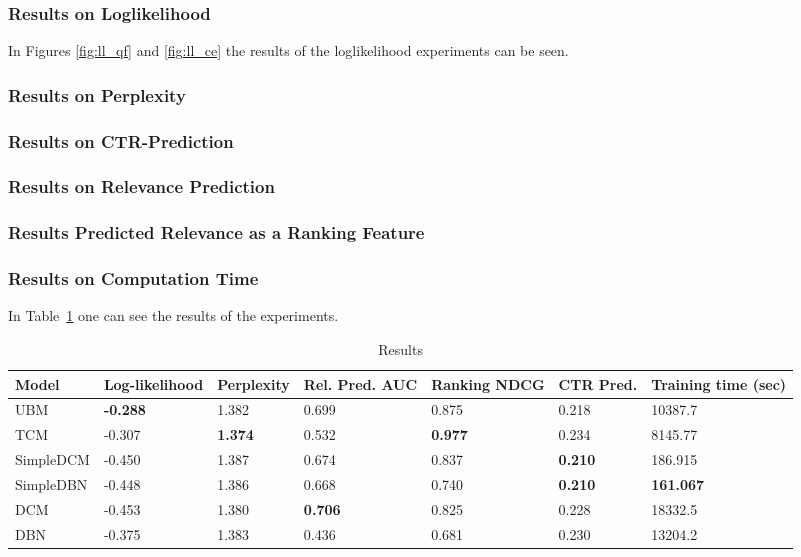 \subsubsection{Results on Loglikelihood}
In Figures \ref{fig:ll_qf} and \ref{fig:ll_ce} the results of the loglikelihood experiments can be seen.

\subsubsection{Results on Perplexity}

\subsubsection{Results on CTR-Prediction}

\subsubsection{Results on Relevance Prediction}

\subsubsection{Results Predicted Relevance as a Ranking Feature}

\subsubsection{Results on Computation Time}

In Table~\ref{table:results} one can see the results of the experiments.

\begin{table}[h]
	\begin{tabular}{@{}lllllll@{}}
		\toprule
		Model     & Log-likelihood  & Perplexity	 & Rel. Pred. AUC		 & Ranking NDCG      & CTR Pred.		 & Training time (sec) \\ \midrule
		UBM       & \textbf{-0.288} & 1.382          & 0.699                 & 0.875			 & 0.218			 & 10387.7                 \\
		TCM       & -0.307          & \textbf{1.374} & 0.532                 & \textbf{0.977}	 & 0.234			 & 8145.77                 \\
		SimpleDCM & -0.450          & 1.387          & 0.674                 & 0.837             & \textbf{0.210}	 & 186.915                 \\
		SimpleDBN & -0.448          & 1.386          & 0.668                 & 0.740             & \textbf{0.210}	 & \textbf{161.067}        \\
		DCM       & -0.453          & 1.380          & \textbf{0.706}        & 0.825			 & 0.228			 & 18332.5                 \\
		DBN       & -0.375          & 1.383          & 0.436                 & 0.681			 & 0.230			 & 13204.2                 \\ \bottomrule
	\end{tabular}
	\caption{Results}
	\label{table:results}
\end{table}
